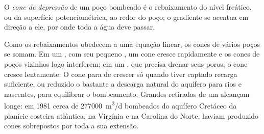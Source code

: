 \begin{definition}\label{def:b3:hydrogeology:cone}
O \emph{cone de depressão} de um poço bombeado é
o rebaixamento do nível freático, ou da superfície potenciométrica,
ao redor do poço; o gradiente se acentua em direção a ele, por onde toda
a água deve passar.
\end{definition}

Como os rebaixamentos obedecem a uma equação linear, os cones de vários poços
se somam. Em um , com seu pequeno , um cone cresce rapidamente
e os cones de poços vizinhos logo interferem; em um ,
que precisa drenar seus poros, o cone cresce lentamente. O cone para de crescer
só quando tiver captado recarga suficiente, ou reduzido o bastante
a descarga natural do aquífero para rios e nascentes, para equilibrar
o bombeamento. Grandes retiradas de um  alcançam longe: em 1981
cerca de \qty{277000}{m^3/d} bombeados do aquífero Cretáceo da planície costeira
atlântica, na Virgínia e na Carolina do Norte, haviam produzido
cones sobrepostos por toda a sua extensão.

